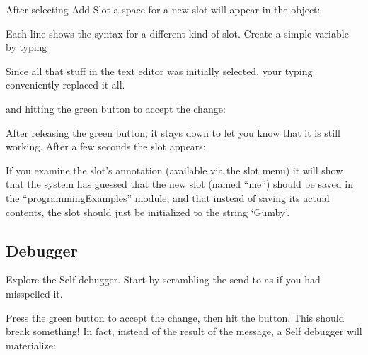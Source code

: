 \documentclass[letterpaper,10pt,english]{sphinxmanual}
\begin{document}
After selecting Add Slot a space for a new slot will appear in the object:
\begin{figure}[htbp]
\centering

\noindent{}
\end{figure}
\newpage
Each line shows the syntax for a different kind of slot. Create a simple variable by typing
\begin{footnote}[4]\sphinxAtStartFootnote
Since all that stuff in the text editor was initially selected, your typing conveniently replaced it all.
%
\end{footnote} and hitting the green button to accept the change:
\begin{figure}[htbp]
\centering

\noindent{}
\end{figure}

After releasing the green button, it stays down to let you know that it is still working. After a few
seconds the slot appears: %
\begin{footnote}[5]\sphinxAtStartFootnote
If you examine the slot’s annotation (available via the slot menu) it will show that the system has guessed that the new slot (named “me”) should be saved in the “programmingExamples” module, and that instead of saving its actual contents, the slot should just be initialized to the string ‘Gumby’.
%
\end{footnote}
\begin{figure}[htbp]
\centering

\noindent{}
\end{figure}
\newpage

\subsection{Debugger}
\label{\detokenize{howtoprg:debugger}}
Explore the Self debugger. Start by scrambling the send to  as
if you had misspelled it.
\begin{figure}[htbp]
\centering

\noindent{}
\end{figure}

Press the green button to accept the change, then hit the  button. This should break something!
In fact, instead of the result of the message, a Self debugger will materialize:
\begin{figure}[htbp]
\centering

\noindent{}
\end{figure}
\end{document}
